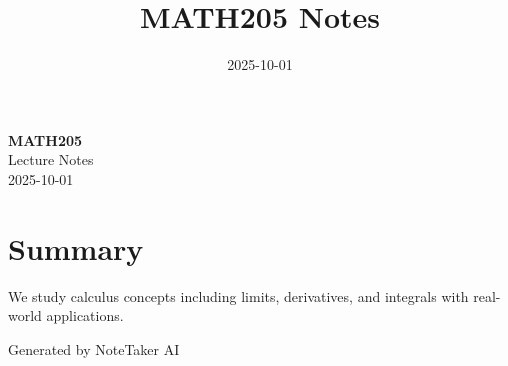 \documentclass[11pt,a4paper]{article}
\title{\textcolor{primarycolor}{\Huge\textbf{MATH205 Notes}}}
\author{}
\date{\textcolor{secondarycolor}{2025-10-01}}
\begin{document}
\begin{center}
    \colorbox{secondarycolor!10}{%
        \parbox{0.95\textwidth}{%
            \centering
            \vspace{0.5cm}
            {\Huge\textcolor{primarycolor}{\textbf{MATH205}}} \\[0.5cm]
            {\Large Lecture Notes} \\[0.3cm]
            {\large\textcolor{secondarycolor}{2025-10-01}}
            \vspace{0.5cm}
        }
    }
\end{center}

\vspace{1cm}

\section*{\textcolor{primarycolor}{Summary}}
We study calculus concepts including limits, derivatives, and integrals with real-world applications.

\vspace{1cm}

\begin{center}
\textcolor{secondarycolor}{\small Generated by NoteTaker AI}
\end{center}
\end{document}
